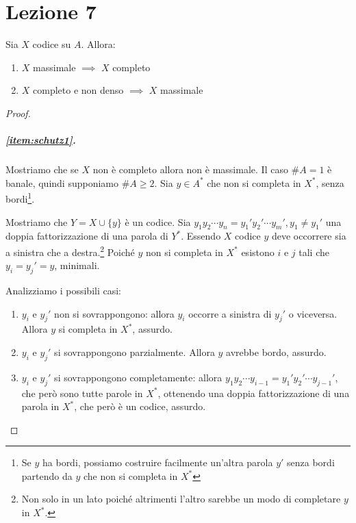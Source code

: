 \chapter{Lezione 7}


\begin{theorem}[Schützenberger]
  Sia \(X\) codice su \(A\). Allora:
  \begin{enumerate}
    \item \(X\) massimale \(\implies\) \(X\) completo\label{item:schutz1}
    \item \(X\) completo e non denso \(\implies\) \(X\) massimale\label{item:schutz2}
  \end{enumerate}
\end{theorem}
\begin{proof}
  \paragraph{\ref{item:schutz1}.}
  Mostriamo che se \(X\) non è completo allora non è massimale.
  Il caso \(\# A = 1\) è banale, quindi supponiamo \(\# A \geq 2\).
  Sia \(y \in A^{*} \) che non si completa in \(X^{*}\), senza bordi\footnote{Se \(y\) ha bordi, possiamo costruire facilmente un'altra parola \(y'\) senza bordi partendo da \(y\) che non si completa in \(X^{*}\)}.


  Mostriamo che \(Y = X \cup \{y\}\) è un codice.
  Sia \(y_1 y_2 \cdots y_n = y_1' y_2' \cdots y_m', y_1\neq y_1'\) una doppia fattorizzazione di una parola di \(Y^*\).
  Essendo \(X\) codice \(y\) deve occorrere sia a sinistra che a destra.\footnote{Non solo in un lato poiché altrimenti l'altro sarebbe un modo di completare \(y\) in \(X^*\).}
  Poiché \(y\) non si completa in \(X^*\) esistono \(i\) e \(j\) tali che \(y_i = y_j' = y\), minimali.


  Analizziamo i possibili casi:
  \begin{enumerate}
    \item \(y_i\) e \(y_j'\) non si sovrappongono: allora \(y_i\) occorre a sinistra di \(y_j'\) o viceversa. Allora \(y\) si completa in \(X^*\), assurdo.
    \item \(y_i\) e \(y_j'\) si sovrappongono parzialmente.
      Allora \(y\) avrebbe bordo, assurdo.
      \item \(y_i\) e \( y_j'\) si sovrappongono completamente: allora \(y_1y_2 \cdots y_{i-1} = y_1'y_2' \cdots y_{j-1}'\), che però sono tutte parole in \(X^*\), ottenendo una doppia fattorizzazione di una parola in \(X^*\), che però è un codice, assurdo. 
  \end{enumerate}
\end{proof}

